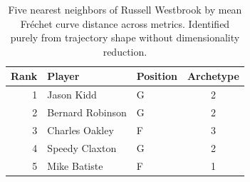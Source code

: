 \begin{table}[htbp]
  \centering\small
  \begin{tabular}{rllc}
    \toprule
    Rank & Player & Position & Archetype \\
    \midrule
    1 & Jason Kidd & G & 2 \\
    2 & Bernard Robinson & G & 2 \\
    3 & Charles Oakley & F & 3 \\
    4 & Speedy Claxton & G & 2 \\
    5 & Mike Batiste & F & 1 \\
    \bottomrule
  \end{tabular}
  \caption{Five nearest neighbors of Russell Westbrook by mean Fr\'{e}chet curve distance across metrics. Identified purely from trajectory shape without dimensionality reduction.}
  \label{tab:Russell_Westbrook_frechet_curve_neighbors}
\end{table}

